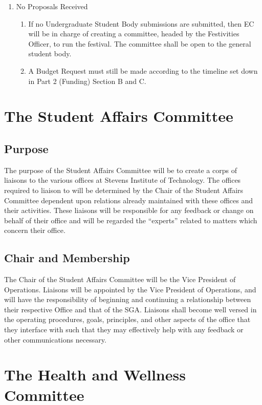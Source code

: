 \documentclass[12pt]{scrreprt}
\begin{document}
\begin{enumerate}
\begin{enumerate}
    \end{enumerate}
  \item No Proposals Received
    \begin{enumerate}
      \item If no Undergraduate Student Body submissions are submitted, then EC will be in charge of creating a committee, headed by the Festivities Officer, to run the festival. The committee shall be open to the general student body.
      \item A Budget Request must still be made according to the timeline set down in Part 2 (Funding) Section B and C.
    \end{enumerate}
\end{enumerate}

\section{The Student Affairs Committee}

\subsection{Purpose}
The purpose of the Student Affairs Committee will be to create a corps of liaisons to the
various offices at Stevens Institute of Technology. The offices required to liaison to will be
determined by the Chair of the Student Affairs Committee dependent upon relations already
maintained with these offices and their activities. These liaisons will be responsible for any
feedback or change on behalf of their office and will be regarded the “experts” related to
matters which concern their office.

\subsection{Chair and Membership}
The Chair of the Student Affairs Committee will be the Vice President of Operations.
Liaisons will be appointed by the Vice President of Operations, and will have the responsibility of beginning and continuing a relationship between their respective Office and that of the SGA. Liaisons shall become well versed in the operating procedures, goals, principles, and other aspects of the office that they interface with such that they may effectively help with any feedback or other communications necessary.

\section{The Health and Wellness Committee}
\end{document}
